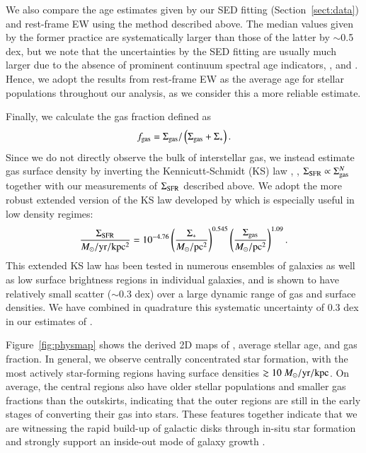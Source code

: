 We also compare the age estimates given by our SED fitting (Section~\ref{sect:data}) and \Hb rest-frame EW using the method
described above. The median values given by the former practice are systematically larger than those of the latter by $\sim$0.5
dex, but we note that the uncertainties by the SED fitting are usually much larger due to the absence of prominent continuum
spectral age indicators, \eg, \Dn and \HdA \citep{Kauffmann:2003cu}. Hence, we adopt the results from \Hb rest-frame EW as the
average age for stellar populations throughout our analysis, as we consider this a more reliable estimate.

Finally, we calculate the gas fraction defined as
\begin{align}
    f_{\rm gas}=\Sigma_{\rm gas}/\left(\Sigma_{\rm gas}+\Sigma_\ast\right).
    \label{eq:fgas}
\end{align}
Since we do not directly observe the bulk of interstellar gas, we instead estimate gas surface density \Sgas by 
inverting the
Kennicutt-Schmidt (KS) law \citep{Schmidt:1959bp,Kennicutt:1998id}, \ie, $\Sigma_{{\rm SFR}}\propto\Sigma_{\rm gas}^{N}$ together with our
measurements of $\Sigma_{{\rm SFR}}$ described above.  We adopt the more robust extended version of the KS law developed by 
\citet{Shi:2011ck,Shi:2018wf} which is especially useful in low density regimes:
\begin{align}
    \frac{\Sigma_{{\rm SFR}}}{M_\odot/\rm yr/\rm kpc^2} = 10^{-4.76} \left(\frac{\Sigma_\ast}{M_\odot/\rm pc^2}\right)^{0.545}
    \left(\frac{\Sigma_{\rm gas}}{M_\odot/\rm pc^2}\right)^{1.09}.
    \label{eq:KSlaw}
\end{align}
This extended KS law has been tested in numerous ensembles of galaxies as well as low surface brightness regions in individual
galaxies, and is shown to have relatively small scatter ($\sim$0.3 dex) over a large dynamic range of gas and \SFR surface
densities. We have combined in quadrature this systematic uncertainty of 0.3 dex in our estimates of \Sgas.

Figure~\ref{fig:physmap} shows the derived 2D maps of \SFR, average stellar age, and gas fraction.
In general, we observe centrally concentrated star formation, with the most actively star-forming regions having surface densities 
$\gtrsim10~M_\odot/\rm yr/\rm kpc$.
On average, the central regions also have older stellar populations and smaller gas fractions than the outskirts, indicating that
the outer regions are still in the early stages of converting their gas into stars.
These features together indicate that we are witnessing the rapid build-up of galactic disks through in-situ star formation and 
strongly support an inside-out mode of galaxy growth \citep{Nelson:2014is,2013ApJ...765...48J}.

